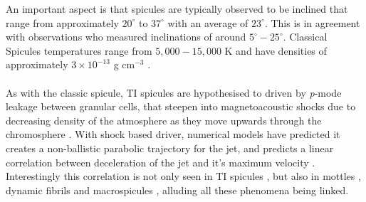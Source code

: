 \documentclass[12pt]{ociamthesis}
\newcommand{\np}{\\ \\}
\begin{document}
%
An important aspect is that spicules are typically observed to be inclined that range from approximately $20^{\circ}$ \cite{Beckers1968} to $37^{\circ}$ \cite{Trujillo2005ApJ619L191T} with an average of $23^{\circ}$. This is in agreement with \cite{Pereira2012} observations who measured inclinations of around $5^{\circ}-25^{\circ}$. Classical Spicules temperatures range from $5,000-15,000$ K and have densities of approximately $3\times10^{-13}$ g cm$^{-3}$ \citep{Sterling_2000SoPh}. \np  
%
As with the classic spicule, TI spicules are hypothesised to driven by \textit{p}-mode leakage between granular cells, that steepen into magnetoacoustic shocks due to decreasing density of the atmosphere as they move upwards through the chromosphere \citep{Pontieu2004Natur, Pontieu2007PASJ, Mart2009ApJ7011569M}. With shock based driver, numerical models have predicted it creates a non-ballistic parabolic trajectory for the jet, and predicts a linear correlation between deceleration of the jet and it's maximum velocity \citep{Heggland2007ApJ6661277H}. Interestingly this correlation is not only seen in TI spicules \citep{Pereira2012}, but also in mottles \citep{Rouppe2007ApJ660L169R}, dynamic fibrils \citep{De_Pontieu2007ApJ} and macrospicules \citep{Loboda2019ApJ871230L}, alluding all these phenomena being linked.
\end{document}
